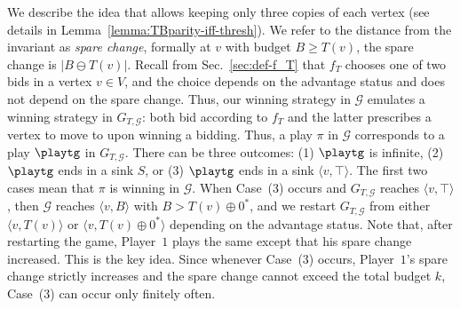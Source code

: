 \documentclass{article}\providecommand{\nequiv}{\not\equiv}\usepackage[a4paper,margin=20mm]{geometry}
\newcommand{\PO}{Player~$1$\xspace}
\newcommand{\G}{{\mathcal G}}
\newcommand{\zug}[1]{\langle #1  \rangle}
\newcommand{\succb}[1]{#1 \oplus 0^*\xspace}
\begin{document}
We describe the idea that allows keeping only three copies of each vertex (see details in Lemma~\ref{lemma:TBparity-iff-thresh}). 
We refer to the distance from the invariant as {\em spare change}, formally at $v$ with budget $B \geq T(v)$, the spare change is \(|B \ominus T(v)|\). 
Recall from Sec.~\ref{sec:def-f_T} that $f_T$ chooses one of two bids in a vertex $v \in V$, and the choice depends on the advantage status and does not depend on the spare change. Thus, our winning strategy in $\G$ emulates a winning strategy in $G_{T,\G}$: both bid according to $f_T$ and the latter prescribes a vertex to move to upon winning a bidding. Thus, a play $\pi$ in $\G$ corresponds to a play $\playtg$ in $G_{T,\G}$.
There can be three outcomes: (1) $\playtg$ is infinite, (2) $\playtg$ ends in a sink $S$, or (3) $\playtg$ ends in a sink $\zug{v,\top}$. The first two cases mean that $\pi$ is winning in $\G$. When Case~(3) occurs and $G_{T, \G}$ reaches $\zug{v, \top}$, then $\G$ reaches $\zug{v, B}$ with $B > \succb{T(v)}$, and we restart $G_{T, \G}$ from either $\zug{v, T(v)}$ or $\zug{v, \succb{T(v)}}$ depending on the advantage status. Note that, after restarting the game, \PO plays the same except that his spare change increased. 
This is the key idea. Since whenever Case~(3) occurs, \PO's spare change strictly increases and the spare change cannot exceed the total budget $k$, Case~(3) can occur only finitely often.
\end{document}
